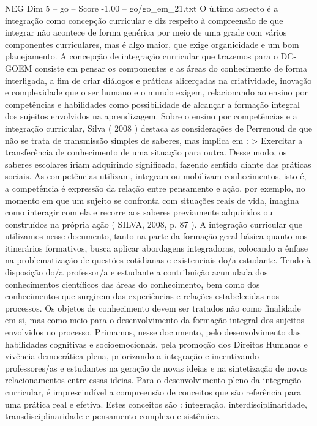 \begin{textsample}{NEG Dim 5 – go – Score -1.00 – go/go\_em\_21.txt}
O último aspecto é a integração como concepção curricular e diz respeito à compreensão de que integrar não acontece de forma genérica por meio de uma grade com vários componentes curriculares, mas é algo maior, que exige organicidade e um bom planejamento.
A concepção de integração curricular que trazemos para o DC-GOEM consiste em pensar os componentes e as áreas do conhecimento de forma interligada, a fim de criar diálogos e práticas alicerçadas na criatividade, inovação e complexidade que o ser humano e o mundo exigem, relacionando ao ensino por competências e habilidades como possibilidade de alcançar a formação integral dos sujeitos envolvidos na aprendizagem.
Sobre o ensino por competências e a integração curricular, Silva ( 2008 ) destaca as considerações de Perrenoud de que não se trata de transmissão simples de saberes, mas implica em : > Exercitar a transferência de conhecimento de uma situação para outra.
Desse modo, os saberes escolares iriam adquirindo significado, fazendo sentido diante das práticas sociais.
As competências utilizam, integram ou mobilizam conhecimentos, isto é, a competência é expressão da relação entre pensamento e ação, por exemplo, no momento em que um sujeito se confronta com situações reais de vida, imagina como interagir com ela e recorre aos saberes previamente adquiridos ou construídos na própria ação ( SILVA, 2008, p. 87 ).
A integração curricular que utilizamos nesse documento, tanto na parte da formação geral básica quanto nos itinerários formativos, busca aplicar abordagens integradoras, colocando a ênfase na problematização de questões cotidianas e existenciais do/a estudante.
Tendo à disposição do/a professor/a e estudante a contribuição acumulada dos conhecimentos científicos das áreas do conhecimento, bem como dos conhecimentos que surgirem das experiências e relações estabelecidas nos processos.
Os objetos de conhecimento devem ser tratados não como finalidade em si, mas como meio para o desenvolvimento da formação integral dos sujeitos envolvidos no processo.
Primamos, nesse documento, pelo desenvolvimento das habilidades cognitivas e socioemocionais, pela promoção dos Direitos Humanos e vivência democrática plena, priorizando a integração e incentivando professores/as e estudantes na geração de novas ideias e na sintetização de novos relacionamentos entre essas ideias.
Para o desenvolvimento pleno da integração curricular, é imprescindível a compreensão de conceitos que são referência para uma prática real e efetiva.
Estes conceitos são : integração, interdisciplinaridade, transdisciplinaridade e pensamento complexo e sistêmico.

\end{textsample}
